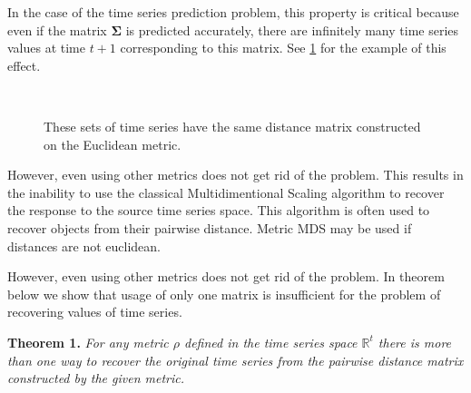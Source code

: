 \documentclass{article}
\begin{document}
In the case of the time series prediction problem, this property is critical because even if the matrix $\mathbf{\Sigma}$ is predicted accurately, there are infinitely many time series values at time $t+1$ corresponding to this matrix. See \ref{fig:fig1} for the example of this effect.
\begin{figure}[H]
	\centering
	\\
	\caption{These sets of time series have the same distance matrix constructed on the Euclidean metric.}
	\label{fig:fig1}
\end{figure}

However, even using other metrics does not get rid of the problem. This results in the inability to use the classical Multidimentional Scaling \cite{MDS} algorithm to recover the response to the source time series space. This algorithm is often used to recover objects from their pairwise distance. Metric MDS may be used if distances are not euclidean.

However, even using other metrics does not get rid of the problem. In theorem below we show that usage of only one matrix is insufficient for the problem of recovering values of time series.

\textbf{Theorem 1.} \textit{For any metric $\rho$ defined in the time series space $\mathbb{R}^t$ there is more than one way to recover the original time series from the pairwise distance matrix constructed by the given metric.}	
\end{document}
